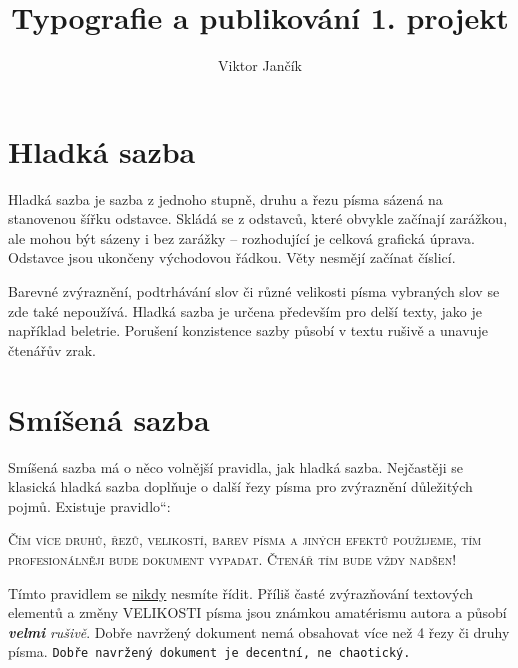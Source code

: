 \documentclass[11pt,a4paper,twocolumn]{article}
\author{Viktor Jančík}
\title{Typografie a publikování 1. projekt}
\providecommand{\uv}[1]{\quotedblbase #1\textquotedblleft}
\begin{document}

\section{Hladká sazba}

Hladká sazba je sazba z jednoho stupně, druhu a řezu pí­sma sázená na stanovenou šířku odstavce. Skládá se z odstavců, které obvykle začínají­ zarážkou, ale mohou být sázeny i bez zarážky -- rozhodují­cí­ je celková grafická úprava. Odstavce jsou ukončeny východovou řádkou. Věty nesmějí začínat číslicí.

Barevné zvýraznění­, podtrhávání­ slov či různé velikosti písma vybraných slov se zde také nepoužívá. Hladká sazba je určena především pro delší­ texty, jako je napří­klad beletrie. Porušení­ konzistence sazby působí v textu rušivě a unavuje čtenářův zrak.


\section{Smíšená sazba}

Smíšená sazba má o něco volnější­ pravidla, jak hladká sazba. Nejčastěji se klasická hladká sazba doplňuje o další řezy pí­sma pro zvýraznění­ důležitých pojmů. Existuje \uv{pravidlo}:

\begin{changemargin}{0.9cm}{0.9cm}
{\hspace{0.5cm} \textsc{Čí­m ví­ce druhů, řezů, velikostí, barev pí­sma a jiných efektů použijeme, tí­m profesionálněji bude  dokument vypadat. Čtenář tím bude vždy nadšen!}}
\end{changemargin}

Tí­mto pravidlem se \underline{nikdy} nesmí­te ří­dit. Příliš časté zvýrazňování textových elementů  a změny {\mbox {\Huge V}{\huge E}{\Large L}{\large I}{\normalsize K}{\small O}{\footnotesize S}{\scriptsize T}{\tiny I} \hspace{0.2cm} pí­sma \hspace{0.2cm} {\Large jsou} \hspace{0.2cm} {\LARGE známkou}} \hspace{0.2cm} {\huge amatérismu} \hspace{0.1cm} autora \hspace{0.15cm} a \hspace{0.15cm} působí­  \hspace{0.15cm} \textbf{\textsl{velmi}} \hspace{0.15cm} \textit{rušivě}. Dobře navržený dokument nemá obsahovat ví­ce než 4 řezy či druhy pí­sma. \texttt{Dobře navržený dokument je decentní­, ne chaotický.}	
\end{document}
